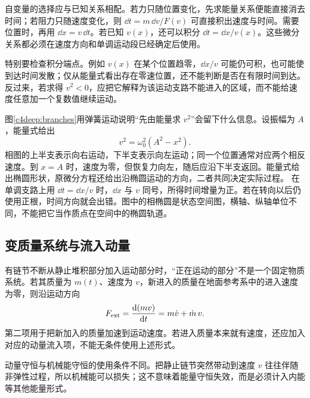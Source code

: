 自变量的选择应与已知关系相配。若力只随位置变化，先求能量关系便能直接消去时间；若阻力只随速度变化，则 $\dd t=m\,\dd v/F(v)$ 可直接积出速度与时间。需要位置时，再用 $\dd x=v\,\dd t$。若已知 $v(x)$，还可以积分 $\dd t=\dd x/v(x)$。这些微分关系都必须在速度方向和单调运动段已经确定后使用。

特别要检查积分端点。例如 $v(x)$ 在某个位置趋零，$\dd x/v$ 可能仍可积，也可能使到达时间发散；仅从能量式看出存在零速位置，还不能判断是否在有限时间到达。反过来，若求得 $v^2<0$，应把它解释为该运动支路不能进入的区域，而不能给速度任意加一个复数值继续运动。


图\ref{c4deep:branches}用弹簧运动说明“先由能量求 $v^2$”会留下什么信息。设振幅为 $A$，能量式给出
\[
 v^2=\omega_0^2(A^2-x^2).
\]
相图的上半支表示向右运动，下半支表示向左运动；同一个位置通常对应两个相反速度。到 $x=A$ 时，速度为零，但恢复力向左，随后应沿下半支返回。能量式给出椭圆形状，原微分方程还给出沿椭圆运动的方向，二者共同决定实际过程。
在单调支路上用 $\dd t=\dd x/v$ 时，$\dd x$ 与 $v$ 同号，所得时间增量为正。若在转向以后仍使用正根，时间方向就会出错。图中的相椭圆是状态空间图，横轴、纵轴单位不同，不能把它当作质点在空间中的椭圆轨道。


\subsection{变质量系统与流入动量}
有链节不断从静止堆积部分加入运动部分时，“正在运动的部分”不是一个固定物质系统。若其质量为 $m(t)$、速度为 $v$，新进入的质量在地面参考系中的进入速度为零，则沿运动方向
\[
 F_{\rm ext}=\frac{\mathop{}\!\mathrm d(mv)}{\mathop{}\!\mathrm d t}=m\dot v+\dot m\,v.
\]
第二项用于把新加入的质量加速到运动速度。若进入质量本来就有速度，还应加入对应的动量流入项，不能无条件使用上述形式。

动量守恒与机械能守恒的使用条件不同。把静止链节突然带动到速度 $v$ 往往伴随非弹性过程，所以机械能可以损失；这不意味着能量守恒失效，而是必须计入内能等其他能量形式。

